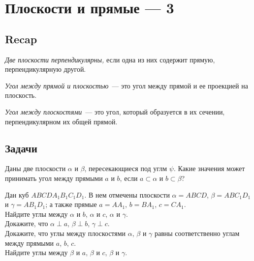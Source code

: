 
\section*{Плоскости и прямые --- 3}

\subsection*{Recap}

\emph{Две плоскости перпендикулярны,} если одна из них содержит прямую,
перпендикулярную другой.

\emph{Угол между прямой и плоскостью}~--- это угол между прямой и ее проекцией
на плоскость.

\emph{Угол между плоскостями}~--- это угол, который образуется в их сечении,
перпендикулярном их общей прямой.

\subsection*{Задачи}

\begin{problems}

\item
Даны две плоскости $\alpha$ и $\beta$, пересекающиеся под углм $\psi$.
Какие значения может принимать угол между прямыми $a$ и $b$, если
$a \subset \alpha$ и $b \subset \beta$?

\item
Дан куб $A B C D A_1 B_1 C_1 D_1$.
В нем отмечены плоскости $\alpha = ABCD$, $\beta = A B C_1 D_1$
и $\gamma = A B_1 D_1$;
а также прямые $a = A A_1$, $b = B A_1$, $c = C A_1$.
\\
\subproblem
Найдите углы между $\alpha$ и $b$, $\alpha$ и $c$, $\alpha$ и $\gamma$.
\\
\subproblem
Докажите, что $\alpha \perp a$, $\beta \perp b$, $\gamma \perp c$.
\\
\subproblem
Докажите, что углы между плоскостями $\alpha$, $\beta$ и $\gamma$ равны
соответственно углам между прямыми $a$, $b$, $c$.
\\
\subproblem
Найдите углы между $\beta$ и $a$, $\beta$ и $c$, $\beta$ и $\gamma$.

\end{problems}

